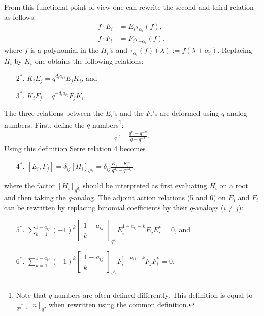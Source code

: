 \begin{construct}
        From this functional point of view one can rewrite the second and third relation as follows:
        \begin{align*}
            f\cdot E_i &= E_i\tau_{\alpha_i}(f),\\
            f\cdot F_i &= F_i\tau_{-\alpha_i}(f),
        \end{align*}
        where $f$ is a polynomial in the $H_i$'s and $\tau_{\alpha_i}(f)(\lambda) := f(\lambda+\alpha_i)$. Replacing $H_i$ by $K_i$ one obtains the following relations:
        \begin{enumerate}
            \item[$2^*.$] $K_iE_j = q^{d_ia_{ij}}E_jK_i$, and
            \item[$3^*.$] $K_iF_j = q^{-d_ia_{ij}}F_jK_i$.
        \end{enumerate}
        The three relations between the $E_i$'s and the $F_i$'s are deformed using $q$-analog numbers. First, define the $q$-numbers\footnote{Note that $q$-numbers are often defined differently. This definition is equal to $\frac{1}{q^{n-1}}[n]_{q^2}$ when rewritten using the common definition.}:
        \begin{gather}
            [n]_q := \frac{q^n - q^{-n}}{q - q^{-1}}.
        \end{gather}
        Using this definition Serre relation 4 becomes
        \begin{enumerate}
            \item[$4^*.$] $[E_i,F_j] = \delta_{ij}[H_i]_{q^{d_i}} = \delta_{ij}\frac{K_i - K_i^{-1}}{q^{d_i} - q^{-d_i}}$,
        \end{enumerate}
        where the factor $[H_i]_{q^{d_i}}$ should be interpreted as first evaluating $H_i$ on a root and then taking the $q$-analog. The adjoint action relations (5 and 6) on $E_i$ and $F_i$ can be rewritten by replacing binomial coefficients by their $q$-analogs ($i\neq j$):
        \begin{enumerate}
            \item[$5^*.$] $\sum_{k=1}^{1-a_{ij}} (-1)^k\begin{bmatrix}1-a_{ij}\\k\end{bmatrix}_{q^{d_i}}E_i^{1-a_{ij}-k}E_jE_i^k = 0$, and
            \item[$6^*.$] $\sum_{k=1}^{1-a_{ij}} (-1)^k\begin{bmatrix}1-a_{ij}\\k\end{bmatrix}_{q^{d_i}}F_i^{1-a_{ij}-k}F_jF_i^k = 0$.
        \end{enumerate}
    \end{construct}

